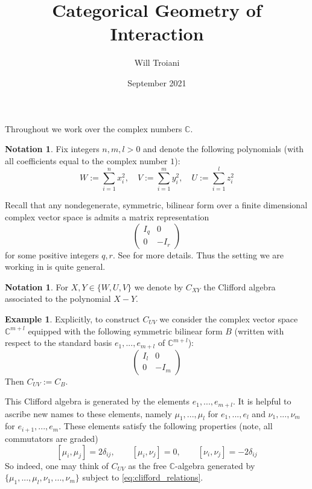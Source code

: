 \documentclass[12pt]{article}
\title{Categorical Geometry of Interaction}
\author{Will Troiani}
\date{September 2021}
\theoremstyle{plain}
\theoremstyle{definition}
\newtheorem{notation}[thm]{Notation}
\newtheorem{example}[thm]{Example}
\newcommand{\bb}[1]{\mathbb{#1}}
\begin{document}
\maketitle

Throughout we work over the complex numbers $\bb{C}$.
\begin{notation}
Fix integers $n,m,l > 0$ and denote the following polynomials (with all coefficients equal to the complex number $1$):
\begin{equation}
W := \sum_{i = 1}^n x_i^2, \quad V := \sum_{i = 1}^m y_i^2, \quad U := \sum_{i =1}^lz_i^2
\end{equation}
\end{notation}
Recall that any nondegenerate, symmetric, bilinear form over a finite dimensional complex vector space is admits a matrix representation
\begin{equation}
\begin{pmatrix}
I_q & 0\\
0 & -I_r
\end{pmatrix}
\end{equation}
for some positive integers $q,r$. See \cite{commalg} for more details. Thus the setting we are working in is quite general.
\begin{notation}
For $X,Y \in \lbrace W,U,V\rbrace$ we denote by $C_{XY}$ the Clifford algebra associated to the polynomial $X - Y$.
\end{notation}
\begin{example}
Explicitly, to construct $C_{UV}$ we consider the complex vector space $\bb{C}^{m + l}$ equipped with the following symmetric bilinear form $B$ (written with respect to the standard basis $e_1,...,e_{m+l}$ of $\bb{C}^{m + l}$):
\begin{equation}
\begin{pmatrix}
I_l & 0\\
0 & -I_m
\end{pmatrix}
\end{equation}
Then $C_{UV} := C_B$.

This Clifford algebra is generated by the elements $e_1,...,e_{m+l}$. It is helpful to ascribe new names to these elements, namely $\mu_1,...,\mu_l$ for $e_1,...,e_l$ and $\nu_1,...,\nu_m$ for $e_{i+1},...,e_m$. These elements satisfy the following properties (note, all commutators are graded)
\begin{equation}\label{eq:clifford_relations}
[\mu_i,\mu_j] = 2\delta_{ij}, \qquad [\mu_i,\nu_j] = 0,\qquad [\nu_i,\nu_j] = -2\delta_{ij}
\end{equation}
So indeed, one may think of $C_{UV}$ as the free $\bb{C}$-algebra generated by $\lbrace \mu_1,...,\mu_l,\nu_1,...,\nu_m\rbrace$ subject to \eqref{eq:clifford_relations}.
\end{example}
\end{document}
